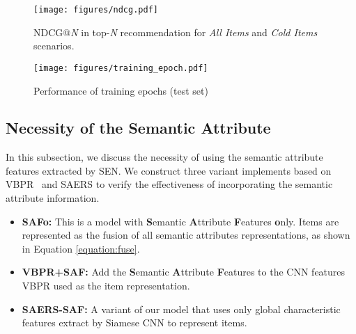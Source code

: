 \documentclass{article}
\begin{document}
\begin{figure}
\texttt{[image: figures/ndcg.pdf]}\caption{NDCG@\textit{N} in top-\textit{N} recommendation for \textit{All Items} and \textit{Cold Items} scenarios.}
\label{fig:ndcg}
\end{figure}



\begin{figure}
\centering
\texttt{[image: figures/training\_epoch.pdf]}\caption{Performance of training epochs (test set)}
\label{fig:auc}
\centering
\bigskip
\end{figure}

\subsection{Necessity of the Semantic Attribute}
In this subsection, we discuss the necessity of using the semantic attribute features extracted by SEN. We construct three variant implements based on VBPR~\cite{he2016vbpr} and SAERS to verify the effectiveness of incorporating the semantic attribute information.
\begin{itemize}[leftmargin=*,itemsep=2.5pt]
		\setlength{\itemsep}{0pt}
	\setlength{\parsep}{0pt}
	\setlength{\parskip}{0pt}

    \item \textbf{SAFo:} This is a model with \textbf{S}emantic \textbf{A}ttribute \textbf{F}eatures \textbf{o}nly. Items are represented as the fusion of all semantic attributes representations, as shown in Equation \ref{equation:fuse}.
\item \textbf{VBPR+SAF:} Add the \textbf{S}emantic \textbf{A}ttribute \textbf{F}eatures to the CNN features VBPR used as the item representation.
    \item \textbf{SAERS-SAF:} A variant of our model that uses only global characteristic features extract by Siamese CNN to represent items.
\end{itemize}
\end{document}
